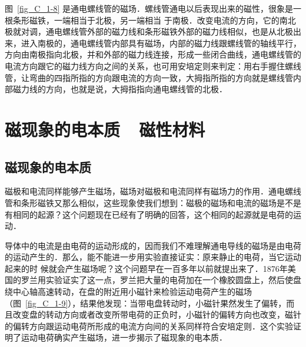 图~\ref{fig_C_1-8} 是通电螺线管的磁场．螺线管通电以后表现出来的磁性，很象是一根条形磁铁，一端相当于北极，另一端相当
于南极．改变电流的方向，它的南北极就对调，通电螺线管外部的磁力线和条形磁铁外部的磁力线相似，也是从北极出
来，进入南极的，通电螺线管内部具有磁场，内部的磁力线跟螺线管的轴线平行，方向由南极指向北极，并和外部的磁力线连接，形成一些闭合曲线，通电螺线管的电流方向跟它的磁力线方向之间的关系，也可用安培定则来判定：用右手握住螺线管，让弯曲的四指所指的方向跟电流的方向一致，大拇指所指的方向就是螺线管内部磁力线的方向，也就是说，大拇指指向通电螺线管的北极．

\section{磁现象的电本质~~磁性材料}
\subsection{磁现象的电本质}


磁极和电流同样能够产生磁场，磁场对磁极和电流同样有磁场力的作用．通电螺线管和条形磁铁又那么相似，这些现象使我们想到：磁极的磁场和电流的磁场是不是有相同的起源？这个问题现在已经有了明确的回答，这个相同的起源就是电荷的运动．

导体中的电流是由电荷的运动形成的，因而我们不难理解通电导线的磁场是由电荷的运动产生的．那么，能不能进一步用实验直接证实：原来静止的电荷，当它运动起来的时
候就会产生磁场呢？这个问题早在一百多年以前就提出来了．1876年美国的罗兰用实验证实了这一点，罗兰把大量的电荷加在一个橡胶圆盘上，然后使盘绕中心轴高速转动，在盘的附近用小磁针来检验运动电荷产生的磁场（图~\ref{fig_C_1-9}），结果他发现：当带电盘转动时，小磁针果然发生了偏转，而且改变盘的转动方向或者改变所带电荷的正负时，小磁针的偏转方向也改变，磁针的偏转方向跟运动电荷所形成的电流方向间的关系同样符合安培定则．这个实验证明了运动电荷确实产生磁场，进一步揭示了磁现象的电本质．

